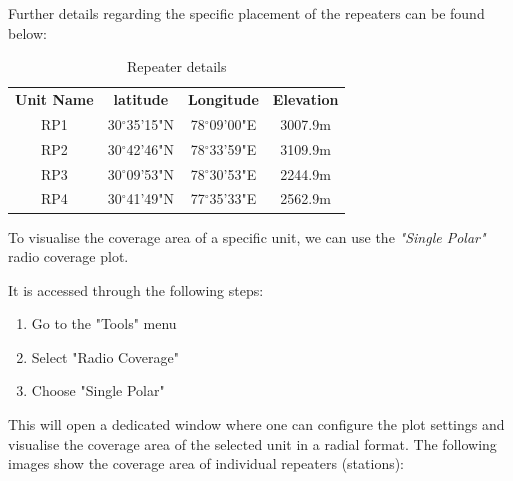 Further details regarding the specific placement of the repeaters can be found below:
\begin{table}[h!]
    \centering
    \begin{tabular}{c c c c}
        \textbf{Unit Name} & \textbf{latitude} & \textbf{Longitude} & \textbf{Elevation}\\
        RP1 & 30$^\circ$35'15"N & 78$^\circ$09'00"E & 3007.9m\\
        RP2 & 30$^\circ$42'46"N & 78$^\circ$33'59"E & 3109.9m\\
        RP3 & 30$^\circ$09'53"N & 78$^\circ$30'53"E & 2244.9m\\
        RP4 & 30$^\circ$41'49"N & 77$^\circ$35'33"E & 2562.9m\\
    \end{tabular}
    \caption{Repeater details}
    \label{tab:repdel}
\end{table}

To visualise the coverage area of a specific unit, we can use the \textit{"Single Polar"} radio coverage plot.

It is accessed through the following steps:
\begin{enumerate}
    \item Go to the "Tools" menu
    \item Select "Radio Coverage"
    \item Choose "Single Polar"
\end{enumerate}
This will open a dedicated window where one can configure the plot settings and visualise the coverage area of the selected unit in a radial format.
The following images show the coverage area of individual repeaters (stations):

